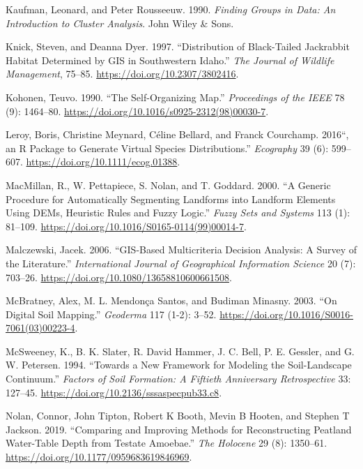 \begin{CSLReferences}{1}{0}
\leavevmode{}%
Kaufman, Leonard, and Peter Rousseeuw. 1990. \emph{Finding Groups in Data: An Introduction to Cluster Analysis}. John Wiley \& Sons.

\leavevmode{}%
Knick, Steven, and Deanna Dyer. 1997. {``Distribution of Black-Tailed Jackrabbit Habitat Determined by {GIS} in {S}outhwestern {I}daho.''} \emph{The Journal of Wildlife Management}, 75--85. \url{https://doi.org/10.2307/3802416}.

\leavevmode{}%
Kohonen, Teuvo. 1990. {``The Self-Organizing Map.''} \emph{Proceedings of the IEEE} 78 (9): 1464--80. \url{https://doi.org/10.1016/s0925-2312(98)00030-7}.

\leavevmode{}%
Leroy, Boris, Christine Meynard, Céline Bellard, and Franck Courchamp. 2016{``, an {R} Package to Generate Virtual Species Distributions.''} \emph{Ecography} 39 (6): 599--607. \url{https://doi.org/10.1111/ecog.01388}.

\leavevmode{}%
MacMillan, R., W. Pettapiece, S. Nolan, and T. Goddard. 2000. {``A Generic Procedure for Automatically Segmenting Landforms into Landform Elements Using {DEM}s, Heuristic Rules and Fuzzy Logic.''} \emph{Fuzzy Sets and Systems} 113 (1): 81--109. \url{https://doi.org/10.1016/S0165-0114(99)00014-7}.

\leavevmode{}%
Malczewski, Jacek. 2006. {``{GIS}-Based Multicriteria Decision Analysis: A Survey of the Literature.''} \emph{International Journal of Geographical Information Science} 20 (7): 703--26. \url{https://doi.org/10.1080/13658810600661508}.

\leavevmode{}%
McBratney, Alex, M. L. Mendonça Santos, and Budiman Minasny. 2003. {``On Digital Soil Mapping.''} \emph{Geoderma} 117 (1-2): 3--52. \url{https://doi.org/10.1016/S0016-7061(03)00223-4}.

\leavevmode{}%
McSweeney, K., B. K. Slater, R. David Hammer, J. C. Bell, P. E. Gessler, and G. W. Petersen. 1994. {``Towards a New Framework for Modeling the Soil-Landscape Continuum.''} \emph{Factors of Soil Formation: A Fiftieth Anniversary Retrospective} 33: 127--45. \url{https://doi.org/10.2136/sssaspecpub33.c8}.

\leavevmode{}%
Nolan, Connor, John Tipton, Robert K Booth, Mevin B Hooten, and Stephen T Jackson. 2019. {``Comparing and Improving Methods for Reconstructing Peatland Water-Table Depth from Testate Amoebae.''} \emph{The Holocene} 29 (8): 1350--61. \url{https://doi.org/10.1177/0959683619846969}.


\end{CSLReferences}
